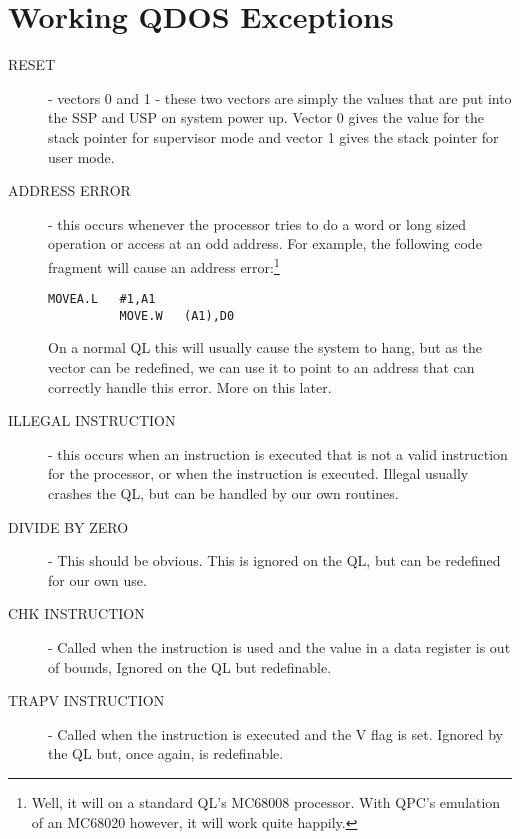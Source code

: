\section{Working QDOS Exceptions}
\label{ch6-qdos-exceptions}%


\begin{description}

\item[RESET] -{} vectors 0 and 1 -{} these two vectors are simply the values that
    are put into the SSP and USP on system power up. Vector 0 gives the value
    for the stack pointer for supervisor mode and vector 1 gives the stack
    pointer for user mode.

\item[ADDRESS ERROR] -{} this occurs whenever the processor tries to do a
    word or long sized operation or access at an odd address. For example, the
    following code fragment will cause an address error:\footnote{Well, it will on a standard QL's MC68008 processor. With QPC's emulation of an MC68020 however, it will work quite happily.}

\begin{lstlisting}[firstnumber=1,]
          MOVEA.L   #1,A1
          MOVE.W   (A1),D0
\end{lstlisting}

On a normal QL this will usually cause the system to hang, but as
    the vector can be redefined, we can use it to point to an address that can
    correctly handle this error. More on this later.

\item[ILLEGAL INSTRUCTION] -{} this occurs when an instruction is executed
    that is not a valid instruction for the processor, or when the 
    instruction is executed. Illegal usually crashes the QL, but can be
    handled by our own routines.

\item[DIVIDE BY ZERO] -{} This should be obvious. This is ignored on the QL,
    but can be redefined for our own use.

\item[CHK INSTRUCTION] -{} Called when the  instruction is used and the
    value in a data register is out of bounds, Ignored on the QL but
    redefinable.

\item[TRAPV INSTRUCTION] -{} Called when the  instruction is executed
    and the V flag is set. Ignored by the QL but, once again, is
    redefinable.


\end{description}
